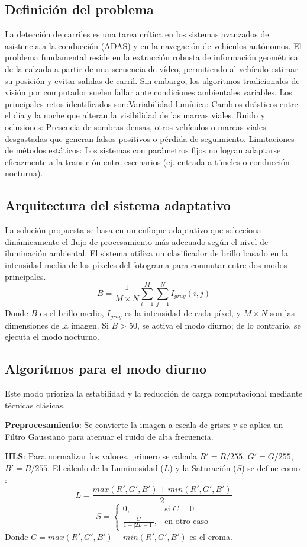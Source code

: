 \documentclass{article}
\begin{document}
\subsection{Definición del problema}
La detección de carriles es una tarea crítica en los sistemas avanzados de asistencia a la conducción (ADAS) y en la navegación de vehículos autónomos. El problema fundamental reside en la extracción robusta de información geométrica de la calzada a partir de una secuencia de vídeo, permitiendo al vehículo estimar su posición y evitar salidas de carril.
Sin embargo, los algoritmos tradicionales de visión por computador suelen fallar ante condiciones ambientales variables. Los principales retos identificados son:Variabilidad lumínica: 
Cambios drásticos entre el día y la noche que alteran la visibilidad de las marcas viales.
Ruido y oclusiones: Presencia de sombras densas, otros vehículos o marcas viales desgastadas que generan falsos positivos o pérdida de seguimiento.
Limitaciones de métodos estáticos: Los sistemas con parámetros fijos no logran adaptarse eficazmente a la transición entre escenarios (ej. entrada a túneles o conducción nocturna).
\subsection{Arquitectura del sistema adaptativo}
La solución propuesta se basa en un enfoque adaptativo que selecciona dinámicamente el flujo de procesamiento más adecuado según el nivel de iluminación ambiental. El sistema utiliza un clasificador de brillo basado en la intensidad media de los píxeles del fotograma para conmutar entre dos modos principales.
$$B = \frac{1}{M \times N} \sum_{i=1}^{M} \sum_{j=1}^{N} I_{gray}(i,j)$$
Donde $B$ es el brillo medio, $I_{gray}$ es la intensidad de cada píxel, y $M \times N$ son las dimensiones de la imagen. Si $B > 50$, se activa el modo diurno; de lo contrario, se ejecuta el modo nocturno.
\subsection{Algoritmos para el modo diurno}
Este modo prioriza la estabilidad y la reducción de carga computacional mediante técnicas clásicas.

\textbf{Preprocesamiento}: Se convierte la imagen a escala de grises y se aplica un Filtro Gaussiano para atenuar el ruido de alta frecuencia.

\textbf{HLS}:
Para normalizar los valores, primero se calcula $R' = R/255$, $G' = G/255$, $B' = B/255$. El cálculo de la Luminosidad ($L$) y la Saturación ($S$) se define como :$$L = \frac{max(R', G', B') + min(R', G', B')}{2}$$$$S = \begin{cases} 0, & \text{si } C = 0 \\ \frac{C}{1 - |2L - 1|}, & \text{en otro caso} \end{cases}$$Donde $C = max(R', G', B') - min(R', G', B')$ es el croma.
\end{document}
